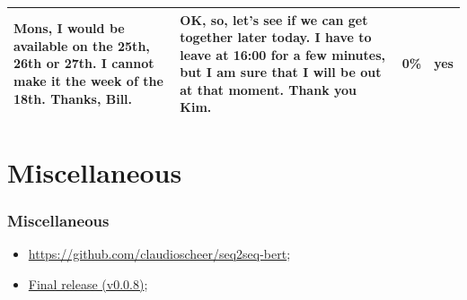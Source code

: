 \documentclass{beamer}
\begin{document}
\begin{frame}
\begin{table}
\begin{tabularx}{\textwidth}{|X|X|c|c|}
      \hline
      Mons, I would be available on the 25th, 26th or 27th. I cannot make it the week of the 18th. Thanks, Bill.                                                                                            & OK, so, let's see if we can get together later today. I have to leave at 16:00 for a few minutes, but I am sure that I will be out at that moment. Thank you Kim.                                                                  & \num{0}{\%}  & yes               \\
      \hline
    \end{tabularx}
  \end{table}
\end{frame}


\section{Miscellaneous}

\begin{frame}
  \frametitle{Miscellaneous}

  \begin{itemize}
    \item \href{https://github.com/claudioscheer/seq2seq-bert}{https://github.com/claudioscheer/seq2seq-bert};
    \item \href{https://github.com/claudioscheer/seq2seq-bert/releases/tag/v0.0.8-alpha}{Final release (v0.0.8)};
  \end{itemize}
\end{frame}
\end{document}
